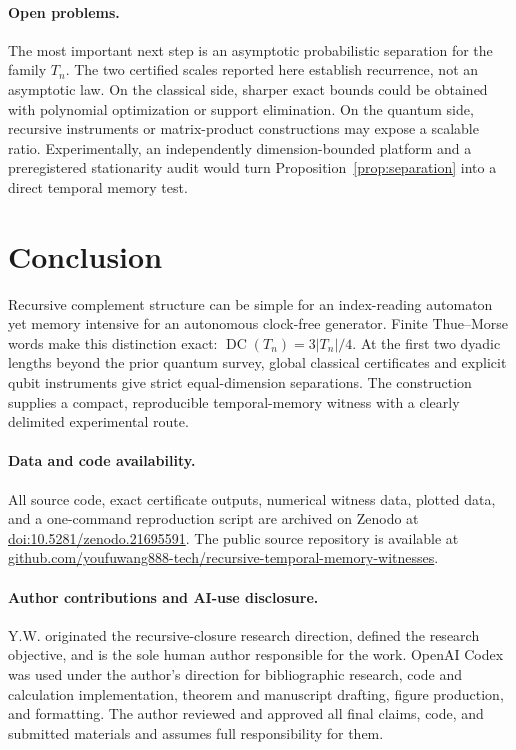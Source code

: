 \documentclass[a4paper,twocolumn,11pt,unpublished]{quantumarticle}
\newcommand{\DC}{\operatorname{DC}}
\begin{document}
\paragraph{Open problems.}
The most important next step is an asymptotic probabilistic separation for
the family $T_n$.  The two certified scales reported here establish
recurrence, not an asymptotic law.  On the classical side, sharper exact
bounds could be obtained with polynomial optimization or support
elimination.  On the quantum side, recursive instruments or matrix-product
constructions may expose a scalable ratio.  Experimentally, an
independently dimension-bounded platform and a preregistered stationarity
audit would turn Proposition~\ref{prop:separation} into a direct temporal
memory test.

\section{Conclusion}

Recursive complement structure can be simple for an index-reading automaton
yet memory intensive for an autonomous clock-free generator.  Finite
Thue--Morse words make this distinction exact:
$\DC(T_n)=3|T_n|/4$.  At the first two dyadic lengths beyond the prior
quantum survey, global classical certificates and explicit qubit instruments
give strict equal-dimension separations.  The construction supplies a
compact, reproducible temporal-memory witness with a clearly delimited
experimental route.

\paragraph{Data and code availability.}
All source code, exact certificate outputs, numerical witness data, plotted
data, and a one-command reproduction script are archived on Zenodo at
\href{https://doi.org/10.5281/zenodo.21695591}
{doi:10.5281/zenodo.21695591}.  The public source repository is available at
\href{https://github.com/youfuwang888-tech/recursive-temporal-memory-witnesses}
{github.com/youfuwang888-tech/recursive-temporal-memory-witnesses}.

\paragraph{Author contributions and AI-use disclosure.}
Y.W. originated the recursive-closure research direction, defined the
research objective, and is the sole human author responsible for the work.
OpenAI Codex was used under the author's direction for bibliographic
research, code and calculation implementation, theorem and manuscript
drafting, figure production, and formatting.  The author reviewed and
approved all final claims, code, and submitted materials and assumes full
responsibility for them.
\end{document}
